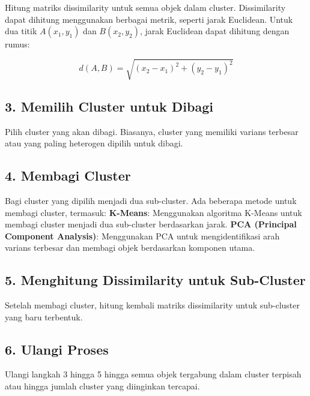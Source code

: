 \documentclass[
  oneside]{book}
\begin{document}
Hitung matriks dissimilarity untuk semua objek dalam cluster. Dissimilarity dapat dihitung menggunakan berbagai metrik, seperti jarak Euclidean. Untuk dua titik \(A(x_1, y_1)\) dan \(B(x_2, y_2)\), jarak Euclidean dapat dihitung dengan rumus:

\[
d(A, B) = \sqrt{(x_2 - x_1)^2 + (y_2 - y_1)^2}
\]

\subsection*{3. Memilih Cluster untuk Dibagi}\label{memilih-cluster-untuk-dibagi}

Pilih cluster yang akan dibagi. Biasanya, cluster yang memiliki varians terbesar atau yang paling heterogen dipilih untuk dibagi.

\subsection*{4. Membagi Cluster}\label{membagi-cluster}

Bagi cluster yang dipilih menjadi dua sub-cluster. Ada beberapa metode untuk membagi cluster, termasuk: \textbf{K-Means}: Menggunakan algoritma K-Means untuk membagi cluster menjadi dua sub-cluster berdasarkan jarak. \textbf{PCA (Principal Component Analysis)}: Menggunakan PCA untuk mengidentifikasi arah varians terbesar dan membagi objek berdasarkan komponen utama.

\subsection*{5. Menghitung Dissimilarity untuk Sub-Cluster}\label{menghitung-dissimilarity-untuk-sub-cluster}

Setelah membagi cluster, hitung kembali matriks dissimilarity untuk sub-cluster yang baru terbentuk.

\subsection*{6. Ulangi Proses}\label{ulangi-proses-1}

Ulangi langkah 3 hingga 5 hingga semua objek tergabung dalam cluster terpisah atau hingga jumlah cluster yang diinginkan tercapai.
\end{document}

